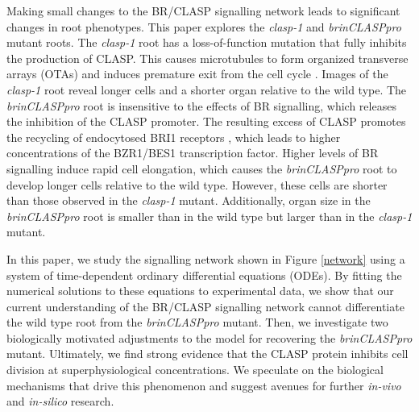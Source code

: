 \documentclass[referee,pdflatex,sn-mathphys-num]{sn-jnl}
\begin{document}
Making small changes to the BR/CLASP signalling network leads to significant changes in root phenotypes.
This paper explores the \emph{clasp-1} \cite{ambrose2007} and \emph{brinCLASPpro} \cite{ruan2018} mutant roots.
The \emph{clasp-1} root has a loss-of-function mutation that fully inhibits the production of CLASP.
This causes microtubules to form organized transverse arrays (OTAs) and induces premature exit from the cell cycle \cite{halat2022}.
Images of the \emph{clasp-1} root reveal longer cells and a shorter organ relative to the wild type.
The \emph{brinCLASPpro} root is insensitive to the effects of BR signalling, which releases the inhibition of the CLASP promoter.
The resulting excess of CLASP promotes the recycling of endocytosed BRI1 receptors \cite{ruan2018}, which leads to higher concentrations of the BZR1/BES1 transcription factor.
Higher levels of BR signalling induce rapid cell elongation, which causes the \emph{brinCLASPpro} root to develop longer cells relative to the wild type.
However, these cells are shorter than those observed in the \emph{clasp-1} mutant.
Additionally, organ size in the \emph{brinCLASPpro} root is smaller than in the wild type but larger than in the \emph{clasp-1} mutant.

In this paper, we study the signalling network shown in Figure \ref{network} using a system of time-dependent ordinary differential equations (ODEs).
By fitting the numerical solutions to these equations to experimental data, we show that our current understanding of the BR/CLASP signalling network cannot differentiate the wild type root from the \emph{brinCLASPpro} mutant.
Then, we investigate two biologically motivated adjustments to the model for recovering the \emph{brinCLASPpro} mutant.
Ultimately, we find strong evidence that the CLASP protein inhibits cell division at superphysiological concentrations.
We speculate on the biological mechanisms that drive this phenomenon and suggest avenues for further \emph{in-vivo} and \emph{in-silico} research.
\end{document}
